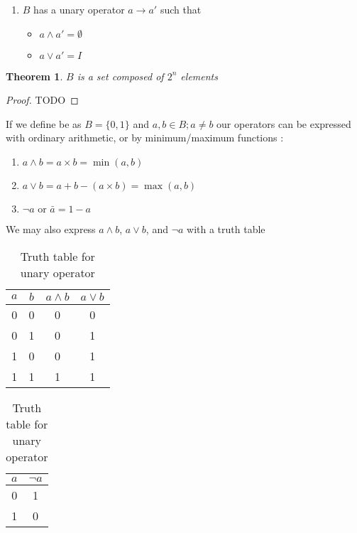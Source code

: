 \documentclass{article}
\newtheorem*{theorem}{Theorem}
\begin{document}
\begin{enumerate}
	      (universal set)
	      \begin{itemize}
	      	\item $\emptyset \wedge a = \emptyset$
	      	\item $\emptyset \vee a = a$
	      	\item $I \wedge a = a$
	      	\item $I \vee a = I$
	      \end{itemize}
	\item $B$ has a unary operator $a\rightarrow a'$ such that
	      \begin{itemize}
	      	\item $a \wedge a' = \emptyset$
	      	\item $a \vee a' = I$
	      \end{itemize}
\end{enumerate}

\begin{theorem}
  $B$ is a set composed of $2^n$ elements
\end{theorem}
\begin{proof}
  TODO
\end{proof}
If we define be as $B = \{0,1\}$ and $a,b\in B; a\neq b$ our operators can be
expressed with ordinary arithmetic, or by minimum/maximum functions
\cite{algebrainterp}:

\begin{enumerate}
	\item $a \wedge b = a \times b = \min(a,b)$
	\item $a \vee b = a + b - (a \times b) = \max(a,b)$
	\item $\neg a\text{ or }\bar{a} = 1 - a$
\end{enumerate}
We may also express $a \wedge b$, $a \vee b$, and $\neg a$ with a truth table

\begin{table}
	\parbox{.45\linewidth}{
		\centering
		\begin{tabular}{@{}c c c c @{}}
			\toprule
			$a$ & $b$ & $a \wedge b$ & $a \vee b$ \\ \toprule
			0   & 0   & 0            & 0          \\ \midrule
			0   & 1   & 0            & 1          \\ \midrule
			1   & 0   & 0            & 1          \\ \midrule
			1   & 1   & 1            & 1          \\ \bottomrule
		\end{tabular}
		\caption{Truth table for binary operators}
	}
	\hfill
	\parbox{.45\linewidth}{
		\centering
		\begin{tabular}{@{} c c @{}}
			\toprule
			$a$ & $\neg a$ \\ \toprule
			0   & 1        \\ \midrule
			1   & 0        \\ \bottomrule
		\end{tabular}
		\caption{Truth table for unary operator }
	}
\end{table}
\end{document}
